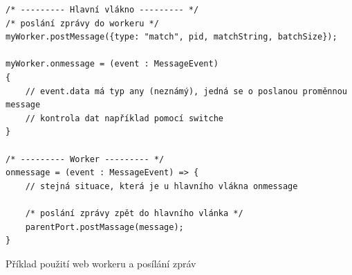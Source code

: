 \begin{code}[!ht]
	\begin{verbatim}
/* --------- Hlavní vlákno --------- */
/* poslání zprávy do workeru */
myWorker.postMessage({type: "match", pid, matchString, batchSize});

myWorker.onmessage = (event : MessageEvent)
{
	// event.data má typ any (neznámý), jedná se o poslanou proměnnou message 
	// kontrola dat například pomocí switche
}

/* --------- Worker --------- */
onmessage = (event : MessageEvent) => {
	// stejná situace, která je u hlavního vlákna onmessage

	/* poslání zprávy zpět do hlavního vlánka */
	parentPort.postMassage(message);
}
	\end{verbatim}
	\caption{Příklad použití web workeru a posílání zpráv}
	\label{code:worker}
\end{code}

\endinput